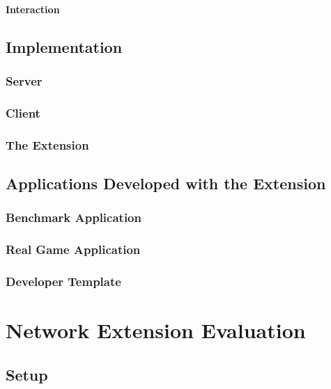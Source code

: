 \documentclass[bsc,frontabs,twoside,singlespacing,parskip,deptreport]{infthesis}     %
\begin{document}
\subsubsection{Interaction}

\section{Implementation}
\subsection{Server}
\subsection{Client}
\subsection{The Extension}
\section{Applications Developed with the Extension}
\subsection{Benchmark Application}
\subsection{Real Game Application}
\subsection{Developer Template}







\chapter{Network Extension Evaluation}
\section{Setup}
\end{document}
